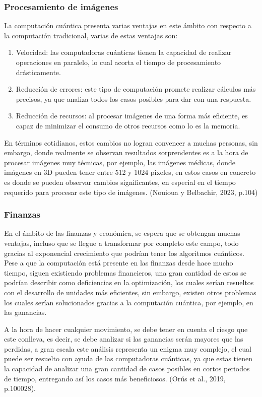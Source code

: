 \documentclass{article}
\begin{document}
\subsubsection{Procesamiento de imágenes} La computación cuántica presenta varias ventajas en este ámbito con respecto a la computación tradicional, varias de estas ventajas son: 
\begin{enumerate}
    \item Velocidad: las computadoras cuánticas tienen la capacidad de realizar operaciones en paralelo, lo cual acorta el tiempo de procesamiento drásticamente.

    \item Reducción de errores: este tipo de computación promete realizar cálculos más precisos, ya que analiza todos los casos posibles para dar con una respuesta.

    \item Reducción de recursos: al procesar imágenes de una forma más eficiente, es capaz de minimizar el consumo de otros recursos como lo es la memoria.
\end{enumerate}

En términos cotidianos, estos cambios no logran convencer a muchas personas, sin embargo, donde realmente se observan resultados sorprendentes es a la hora de procesar imágenes muy técnicas, por ejemplo, las imágenes médicas, donde imágenes en 3D pueden tener entre 512 y 1024 pixeles, en estos casos en concreto es donde se pueden observar cambios significantes, en especial en el tiempo requerido para procesar este tipo de imágenes. (Nouioua y Belbachir, 2023, p.104)

 \subsubsection{Finanzas} En el ámbito de las finanzas y económica, se espera que se obtengan muchas ventajas, incluso que se llegue a transformar por completo este campo, todo gracias al exponencial crecimiento que podrían tener los algoritmos cuánticos.
Pese a que la computación está presente en las finanzas desde hace mucho tiempo, siguen existiendo problemas financieros, una gran cantidad de estos se podrían describir como deficiencias en la optimización, los cuales serían resueltos con el desarrollo de unidades más eficientes, sin embargo, existen otros problemas los cuales serían solucionados gracias a la computación cuántica, por ejemplo, en las ganancias. 

A la hora de hacer cualquier movimiento, se debe tener en cuenta el riesgo que este conlleva, es decir, se debe analizar si las ganancias serán mayores que las perdidas, a gran escala este análisis representa un enigma muy complejo, el cual puede ser resuelto con ayuda de las computadoras cuánticas, ya que estas tienen la capacidad de analizar una gran cantidad de casos posibles en cortos periodos de tiempo, entregando así los casos más beneficiosos. (Orús et al., 2019, p.100028).
\end{document}
